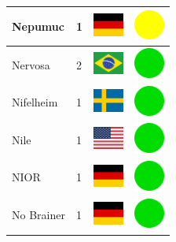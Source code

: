 \documentclass[12pt, a4paper, twoside]{report}
\begin{document}
\begin{center}
\begin{longtable}{|p{5cm}|p{2cm}|p{2cm}|p{2cm}|}
			Nepumuc & 1 & \includegraphics[width=1cm]{4x3/de} & \includegraphics[width=1cm]{likes/m} \\ \hline
			Nervosa & 2 & \includegraphics[width=1cm]{4x3/br} & \includegraphics[width=1cm]{likes/y} \\ \hline
			Nifelheim & 1 & \includegraphics[width=1cm]{4x3/se} & \includegraphics[width=1cm]{likes/y} \\ \hline
			Nile & 1 & \includegraphics[width=1cm]{4x3/us} & \includegraphics[width=1cm]{likes/y} \\ \hline
			NIOR & 1 & \includegraphics[width=1cm]{4x3/de} & \includegraphics[width=1cm]{likes/y} \\ \hline
			No Brainer & 1 & \includegraphics[width=1cm]{4x3/de} & \includegraphics[width=1cm]{likes/y} \\ \hline

\end{longtable}
\end{center}
\end{document}
